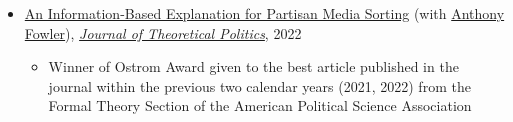 \documentclass[11pt, Letter]{article}
\begin{document}
\begin{itemize}[leftmargin=47pt,itemindent=-21pt]
\item[] \href{https://kisookim.github.io/assets/papers/partisan-media-sorting.pdf}{An Information-Based Explanation for Partisan Media Sorting} (with \href{https://voices.uchicago.edu/fowler/}{Anthony Fowler}), \href{https://journals.sagepub.com/doi/10.1177/09516298221122094}{\textit{Journal of Theoretical Politics}}, 2022
\begin{itemize}
    \item[] \small{Winner of Ostrom Award given to the best article published in the journal within the previous two calendar years (2021, 2022) from the Formal Theory Section of the American Political Science Association}
\end{itemize}
\end{itemize}

\vspace{3mm}
\end{document}
